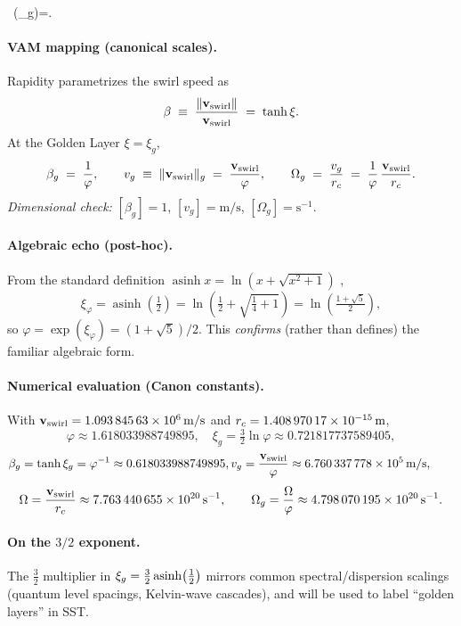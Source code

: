     \ \coth(\xi_g)=\varphi.

\paragraph*{VAM mapping (canonical scales).}
Rapidity parametrizes the swirl speed as
\[
    \beta \;\equiv\; \frac{\|\mathbf{v}_{\mathrm{swirl}}\|}{\mathbf{v}_{\mathrm{swirl}}} \;=\; \tanh\xi.
\]
At the Golden Layer \(\xi=\xi_g\),
\[
    \beta_g \;=\; \frac{1}{\varphi},\qquad
    v_g \;\equiv\; \|\mathbf{v}_{\mathrm{swirl}}\|_g \;=\; \frac{\mathbf{v}_{\mathrm{swirl}}}{\varphi},\qquad
    \Omega_g \;=\; \frac{v_g}{r_c} \;=\; \frac{1}{\varphi}\,\frac{\mathbf{v}_{\mathrm{swirl}}}{r_c}.
\]
\emph{Dimensional check:} \([\beta_g]=1\), \([v_g]=\mathrm{m/s}\), \([\Omega_g]=\mathrm{s}^{-1}\).

\paragraph*{Algebraic echo (post-hoc).}
From the standard definition \(\operatorname{asinh}x=\ln(x+\sqrt{x^2+1})\) \cite{NISTDLMF},
\[
    \xi_\varphi=\operatorname{asinh}\!\left(\tfrac{1}{2}\right)
    =\ln\!\left(\tfrac{1}{2}+\sqrt{\tfrac{1}{4}+1}\right)
    =\ln\!\left(\tfrac{1+\sqrt5}{2}\right),
\]
so \(\varphi=\exp(\xi_\varphi)=(1+\sqrt5)/2\). This \emph{confirms} (rather than defines) the familiar algebraic form.

\paragraph*{Numerical evaluation (Canon constants).}
With \(\mathbf{v}_{\mathrm{swirl}}=\SI{1.09384563e6}{m/s}\) and \(r_c=\SI{1.40897017e-15}{m}\),
\[
    \varphi \approx 1.618033988749895,\quad
    \xi_g=\tfrac{3}{2}\ln\varphi \approx 0.721817737589405,
\]
\[
    \beta_g=\tanh\xi_g=\varphi^{-1}\approx 0.618033988749895,
    v_g=\frac{\mathbf{v}_{\mathrm{swirl}}}{\varphi}\approx \SI{6.760337778e5}{m/s},\qquad
\]
\[
    \Omega=\frac{\mathbf{v}_{\mathrm{swirl}}}{r_c}\approx \SI{7.763440655e20}{s^{-1}},\qquad
    \Omega_g=\frac{\Omega}{\varphi}\approx \SI{4.798070195e20}{s^{-1}}.
\]




\paragraph*{On the \(3/2\) exponent.}
The \(\tfrac{3}{2}\) multiplier in \(\xi_g=\tfrac{3}{2}\operatorname{asinh}\!\left(\tfrac{1}{2}\right)\) mirrors common spectral/dispersion scalings
(quantum level spacings, Kelvin-wave cascades), and will be used to label “golden layers” in SST.

